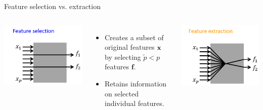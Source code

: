 \documentclass[11pt,compress,t,notes=noshow, xcolor=table]{beamer}
\begin{document}
  \begin{vbframe}{Feature selection vs. extraction}

    \begin{columns}


      \medskip

      \includegraphics{figure_man/feature_selection.png}

      \smallskip

      \begin{itemize}
        \item Creates a subset of original features $\mathbf{x}$ by selecting $\tilde{p} < p$ features $\bm{f}$.
        \item Retains information on selected individual features.
      \end{itemize}


      \medskip

      \includegraphics{figure_man/feature_extraction.png}


\end{columns}
\end{vbframe}
\end{document}

